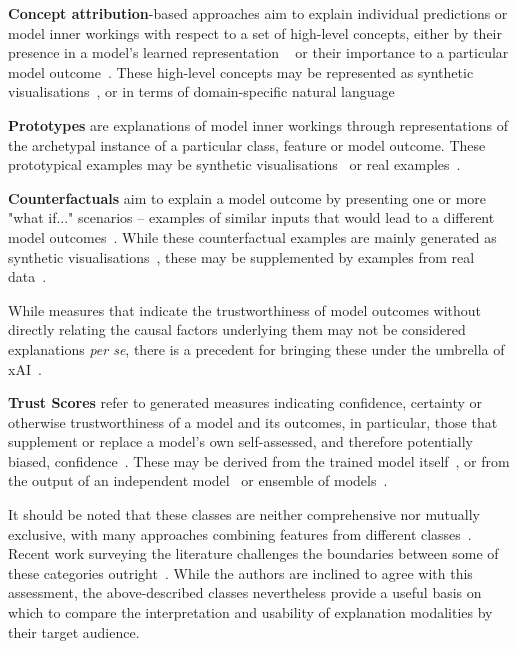 \textbf{Concept attribution}-based approaches aim to explain individual predictions or model inner workings with respect to a set of high-level concepts, either by their presence in a model's learned representation ~\cite{GrazianiHenning:2020:ConceptAttribution} or their importance to a particular model outcome~\cite{kim2018interpretability}. These high-level concepts may be represented as synthetic visualisations~\cite{erhan2009visualizing, yosinski2015deepvisualization}, or in terms of domain-specific natural language~\cite{GrazianiHenning:2020:ConceptAttribution, kim2018interpretability} 

\textbf{Prototypes} are explanations of model inner workings through representations of the archetypal instance of a particular class, feature or model outcome. These prototypical examples may be synthetic visualisations~\cite{li2018deep} or real examples~\cite{kim2016examples}.

\textbf{Counterfactuals} aim to explain a model outcome by presenting one or more "what if..." scenarios -- examples of similar inputs that would lead to a different model outcomes~\cite{ginsberg1986counterfactuals}. While these counterfactual examples are mainly generated as synthetic visualisations~\cite{seah2019chest, poceviciute_survey_2020, liu2019generative}, these may be supplemented by examples from real data~\cite{gulshad2021counterfactual}.

While measures that indicate the trustworthiness of model outcomes without directly relating the causal factors underlying them may not be considered explanations \textit{per se}, there is a precedent for bringing these under the umbrella of xAI~\cite{poceviciute_survey_2020, lin2019explanations}.

\textbf{Trust Scores} refer to generated measures indicating confidence, certainty or otherwise trustworthiness of a model and its outcomes, in particular, those that supplement or replace a model's own self-assessed, and therefore potentially biased, confidence~\cite{jiang2018trust, wang2021ai}. These may be derived from the trained model itself~\cite{tagasovska2019single}, or from the output of an independent model~\cite{jiang2018trust} or ensemble of models~\cite{pearce2018high}.

It should be noted that these classes are neither comprehensive nor mutually exclusive, with many approaches combining features from different classes~\cite{kim2016examples,liu2019generative}. Recent work surveying the literature challenges the boundaries between some of these categories outright~\cite{zhang2021survey}. While the authors are inclined to agree with this assessment, the above-described classes nevertheless provide a useful basis on which to compare the interpretation and usability of explanation modalities by their target audience.


